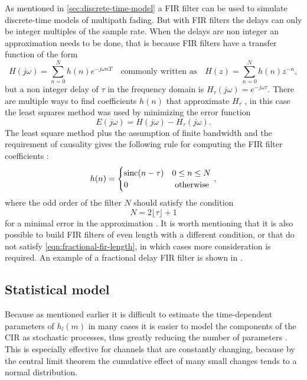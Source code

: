 As mentioned in \ref{sec:discrete-time-model} a FIR filter can be used to simulate discrete-time models of multipath fading. But with FIR filters the delays can only be integer multiples of the sample rate. When the delays are non integer an approximation needs to be done, that is because FIR filters have a transfer function of the form
\begin{equation} \label{eqn:transfer-function-fir}
	H(j\omega) = \sum_{n = 0}^{N} h(n) e^{-j\omega nT}
	\quad \text{commonly written as} \quad
	H(z) = \sum_{n = 0}^{N} h(n) z^{-n},
\end{equation}
but a non integer delay of \(\tau\) in the frequency domain is \(H_\tau(j\omega) = e^{-j\omega \tau}\). There are multiple ways to find coefficients \(h(n)\) that approximate \(H_\tau\) \cite{Valimaki1995}, in this case the least squares method was used by minimizing the error function
\begin{equation}
	E(j\omega) = H(j\omega) - H_\tau(j\omega).
\end{equation}
The least square method plus the assumption of finite bandwidth and the requirement of causality gives the following rule for computing the FIR filter coefficients \cite{Valimaki1995}:
\begin{equation}
	h(n)= \begin{cases}
		\operatorname{sinc} (n - \tau) & 0 \leq n \leq N \\ 
		0 & \text { otherwise }
	\end{cases},
\end{equation}
where the odd order of the filter \(N\) should satisfy the condition
\begin{equation} \label{eqn:fractional-fir-length}
	N = 2 \lfloor \tau \rfloor + 1
\end{equation}
for a minimal error in the approximation \cite{Valimaki1995}. It is worth mentioning that it is also possible to build FIR filters of even length with a different condition, or that do not satisfy \eqref{eqn:fractional-fir-length}, in which cases more consideration is required. An example of a fractional delay FIR filter is shown in .

\subsection{Statistical model} \label{sec:statistical-model}

Because as mentioned earlier it is difficult to estimate the time-dependent parameters of \(h_l(m)\) in many cases it is easier to model the components of the CIR as stochastic processes, thus greatly reducing the number of parameters \cite{Messier,Mathis}. This is especially effective for channels that are constantly changing, because by the central limit theorem the cumulative effect of many small changes tends to a normal distribution.

